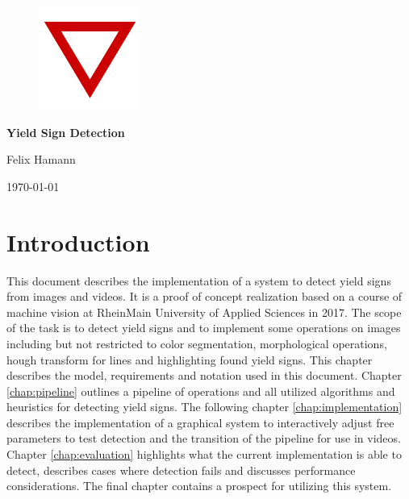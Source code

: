 \documentclass{report}
\begin{document}
%
%


{\centering

  \begin{figure}
    \vspace{3cm}

    \centering
    \includegraphics[width=0.3\textwidth]{src/yield}

    \vspace{4cm}
  \end{figure}


  {\Huge\textbf{Yield Sign Detection}}
  \vspace{.4cm}

  Felix Hamann

  \vspace{.2cm}

  \today

}


%
%

\tableofcontents


\chapter{Introduction}

This document describes the implementation of a system to detect yield
signs from images and videos. It is a proof of concept realization
based on a course of machine vision at RheinMain University of Applied
Sciences in 2017. The scope of the task is to detect yield signs and
to implement some operations on images including but not restricted to
color segmentation, morphological operations, hough transform for
lines and highlighting found yield signs. This chapter describes the
model, requirements and notation used in this document. Chapter
\ref{chap:pipeline} outlines a pipeline of operations and all utilized
algorithms and heuristics for detecting yield signs. The following
chapter \ref{chap:implementation} describes the implementation of a
graphical system to interactively adjust free parameters to test
detection and the transition of the pipeline for use in
videos. Chapter \ref{chap:evaluation} highlights what the current
implementation is able to detect, describes cases where detection
fails and discusses performance considerations. The final chapter
contains a prospect for utilizing this system.
\end{document}
